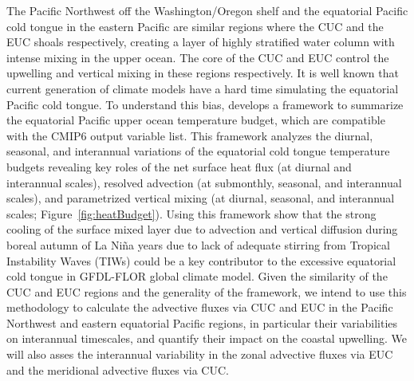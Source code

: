 The Pacific Northwest off the Washington/Oregon shelf and the equatorial Pacific cold tongue in the eastern Pacific are similar regions where the CUC and the EUC shoals respectively, creating a layer of highly stratified water column with intense mixing in the upper ocean. The core of the CUC and EUC control the upwelling and vertical mixing in these regions respectively. It is well known that current generation of climate models have a hard time simulating the equatorial Pacific cold tongue. To understand this bias,  \citet{ray2018understanding} develops a framework to summarize the equatorial Pacific upper ocean temperature budget, which are compatible with the CMIP6 output variable list. This framework analyzes the diurnal, seasonal, and interannual variations of the equatorial cold tongue temperature budgets revealing key roles of the net surface heat flux (at diurnal and interannual scales), resolved advection (at submonthly, seasonal, and interannual scales), and parametrized vertical mixing (at diurnal, seasonal, and interannual scales; Figure~\ref{fig:heatBudget}). Using this framework \citet{ray2018understanding,ray2018evaluation} show that the strong cooling of the surface mixed layer due to advection and vertical diffusion during boreal autumn of La Ni{\~n}a years due to lack of adequate stirring from Tropical Instability Waves (TIWs) could be a key contributor to the excessive equatorial cold tongue in GFDL-FLOR global climate model. Given the similarity of the CUC and EUC regions and the generality of the framework, we intend to use this methodology to calculate the advective fluxes via CUC and EUC in the Pacific Northwest and eastern equatorial Pacific regions, in particular their variabilities on interannual timescales, and quantify their impact on the coastal upwelling.
We will also asses the interannual variability in the zonal advective fluxes via EUC and the meridional advective fluxes via CUC. 

